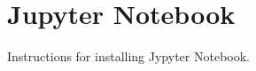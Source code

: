 \section{Jupyter Notebook}
\label{sec:jupyter_notebook}

Instructions for installing Jypyter Notebook.

